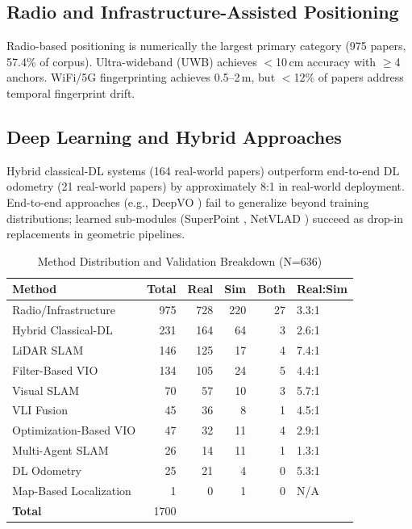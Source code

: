 \documentclass[journal]{IEEEtran}
\begin{document}
\subsection{Radio and Infrastructure-Assisted Positioning}
Radio-based positioning is numerically the largest primary category
(975 papers, 57.4\% of corpus). Ultra-wideband (UWB) achieves $<$10\,cm
accuracy with $\geq$4 anchors. WiFi/5G fingerprinting achieves 0.5--2\,m,
but $<$12\% of papers address temporal fingerprint drift.

\subsection{Deep Learning and Hybrid Approaches}
Hybrid classical-DL systems (164 real-world papers) outperform end-to-end
DL odometry (21 real-world papers) by approximately 8:1 in real-world
deployment. End-to-end approaches (e.g., DeepVO \cite{Wang2017}) fail to
generalize beyond training distributions; learned sub-modules
(SuperPoint \cite{DeTone2018}, NetVLAD \cite{Arandjelovic2016}) succeed
as drop-in replacements in geometric pipelines.

\begin{table}[!t]
  \renewcommand{\arraystretch}{1.2}
  \caption{Method Distribution and Validation Breakdown (N=636)}
  \label{tab:method_dist}
  \centering
  \begin{tabular}{lrrrrl}
    \toprule
    \textbf{Method} & \textbf{Total} & \textbf{Real} & \textbf{Sim}
      & \textbf{Both} & \textbf{Real:Sim} \\
    \midrule
    Radio/Infrastructure      & 975 & 728 & 220 & 27 & 3.3:1 \\
    Hybrid Classical-DL       & 231 & 164 &  64 &  3 & 2.6:1 \\
    LiDAR SLAM                & 146 & 125 &  17 &  4 & 7.4:1 \\
    Filter-Based VIO          & 134 & 105 &  24 &  5 & 4.4:1 \\
    Visual SLAM               &  70 &  57 &  10 &  3 & 5.7:1 \\
    VLI Fusion                &  45 &  36 &   8 &  1 & 4.5:1 \\
    Optimization-Based VIO    &  47 &  32 &  11 &  4 & 2.9:1 \\
    Multi-Agent SLAM          &  26 &  14 &  11 &  1 & 1.3:1 \\
    DL Odometry               &  25 &  21 &   4 &  0 & 5.3:1 \\
    Map-Based Localization    &   1 &   0 &   1 &  0 & N/A   \\
    \midrule
    \textbf{Total}            & 1700 & & & & \\
    \bottomrule
  \end{tabular}
\end{table}
\end{document}
